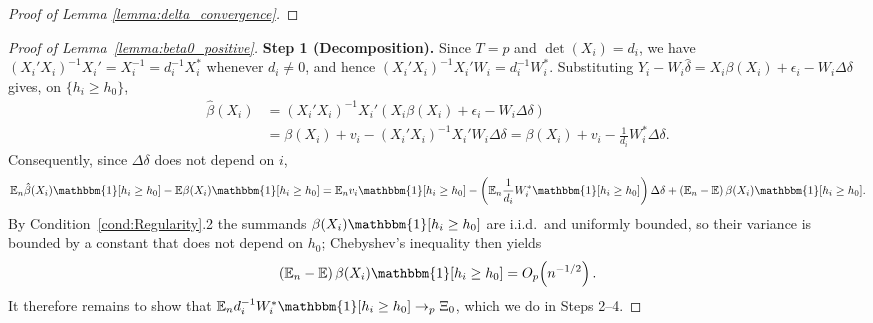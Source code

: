 \documentclass{article}
\newcommand{\E}{\mathbb{E}}
\newcommand{\I}{\mathbbm{1}}
\begin{document}
\begin{appendices}
\begin{proof}[Proof of Lemma \ref{lemma:delta_convergence}]
\end{proof}

\begin{proof}[Proof of Lemma~\ref{lemma:beta0_positive}]

\textbf{Step 1 (Decomposition).}
Since $T=p$ and $\det(X_i)=d_i$, we have
$(X_i'X_i)^{-1}X_i'=X_i^{-1}=d_i^{-1}X_i^{*}$ whenever $d_i\ne 0$, and hence
$(X_i'X_i)^{-1}X_i'W_i=d_i^{-1}W_i^{*}$. Substituting
$Y_i-W_i\hat\delta = X_i\beta(X_i)+\epsilon_i-W_i\Delta\delta$ gives, on
$\{h_i\ge h_0\}$,
\begin{align*}
    \hat{\beta}(X_i)
    &= (X_i'X_i)^{-1}X_i'\left(X_i\beta(X_i)+\epsilon_i-W_i\Delta\delta\right)\\
    &= \beta(X_i) + v_i - (X_i'X_i)^{-1}X_i'W_i\Delta\delta
     = \beta(X_i) + v_i - \frac{1}{d_i}W_i^{*}\Delta\delta .
\end{align*}
Consequently, since $\Delta\delta$ does not depend on $i$,
\begin{align}\label{eq:beta0_decomposition}
    \E_n \hat{\beta}(X_i)\I[h_i\geq h_0] - \E \beta(X_i)\I[h_i\geq h_0]
    = \E_n v_i\I[h_i\geq h_0]
      - \left(\E_n \frac{1}{d_i}W_i^{*}\I[h_i\geq h_0]\right)\Delta\delta
      + \left(\E_n-\E\right)\beta(X_i)\I[h_i\geq h_0].
\end{align}
By Condition~\ref{cond:Regularity}.2 the summands
$\beta(X_i)\I[h_i\ge h_0]$ are i.i.d.\ and uniformly bounded, so their variance
is bounded by a constant that does not depend on $h_0$; Chebyshev's inequality
then yields
\begin{align}\label{eq:beta0_root_n}
    \left(\E_n-\E\right)\beta(X_i)\I[h_i\geq h_0]=O_p\!\left(n^{-1/2}\right).
\end{align}
It therefore remains to show that
$\E_n d_i^{-1}W_i^{*}\I[h_i\geq h_0]\to_p\Xi_0$, which we do in Steps 2--4.



\end{proof}
\end{appendices}
\end{document}
